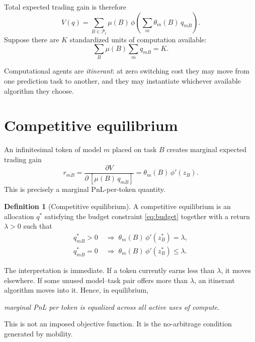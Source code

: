 \documentclass[11pt]{article}
\theoremstyle{definition}
\newtheorem{definition}{Definition}
\theoremstyle{remark}
\begin{document}
Total expected trading gain is therefore
\begin{equation}
\label{eq:V}
V(q) = \sum_{B \in \mathcal{P}_t} \mu(B)\, \phi\!\left( \sum_m \theta_m(B)\, q_{mB} \right).
\end{equation}
Suppose there are $K$ standardized units of computation available:
\begin{equation}
\label{eq:budget}
\sum_B \mu(B) \sum_m q_{mB} = K.
\end{equation}

Computational agents are \emph{itinerant}: at zero switching cost they may move from one prediction task to another, and they may instantiate whichever available algorithm they choose.

\section{Competitive equilibrium}
\label{sec:equilibrium}

An infinitesimal token of model $m$ placed on task $B$ creates marginal expected trading gain
\begin{equation}
\label{eq:return}
r_{mB} = \frac{\partial V}{\partial\, [\mu(B)\, q_{mB}]} = \theta_m(B)\, \phi'(z_B).
\end{equation}
This is precisely a marginal PnL-per-token quantity.

\begin{definition}[Competitive equilibrium]
A competitive equilibrium is an allocation $q^*$ satisfying the budget constraint \eqref{eq:budget} together with a return $\lambda > 0$ such that
\begin{align}
q^*_{mB} > 0 &\;\Longrightarrow\; \theta_m(B)\, \phi'(z^*_B) = \lambda, \label{eq:eq1}\\
q^*_{mB} = 0 &\;\Longrightarrow\; \theta_m(B)\, \phi'(z^*_B) \le \lambda. \label{eq:eq2}
\end{align}
\end{definition}

The interpretation is immediate. If a token currently earns less than $\lambda$, it moves elsewhere. If some unused model--task pair offers more than $\lambda$, an itinerant algorithm moves into it. Hence, in equilibrium,
\begin{center}
\emph{marginal PnL per token is equalized across all active uses of compute.}
\end{center}
This is not an imposed objective function. It is the no-arbitrage condition generated by mobility.
\end{document}
